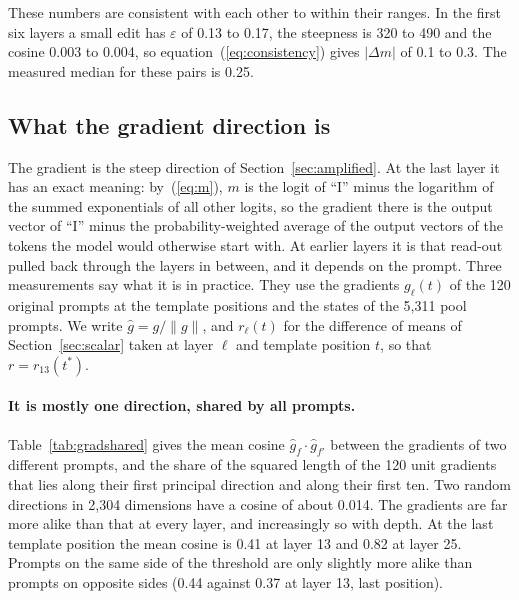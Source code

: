 \documentclass[11pt]{article}
\newcommand{\Dm}{\Delta m}
\begin{document}
These numbers are consistent with each other to within their ranges. In the first six layers a small edit has $\varepsilon$ of 0.13 to 0.17, the steepness is 320 to 490 and the cosine 0.003 to 0.004, so equation~(\ref{eq:consistency}) gives $|\Dm|$ of 0.1 to 0.3. The measured median for these pairs is 0.25.

\subsection{What the gradient direction is}
\label{sec:gradmeaning}

The gradient is the steep direction of Section~\ref{sec:amplified}. At the last layer it has an exact meaning: by~(\ref{eq:m}), $m$ is the logit of ``I'' minus the logarithm of the summed exponentials of all other logits, so the gradient there is the output vector of ``I'' minus the probability-weighted average of the output vectors of the tokens the model would otherwise start with. At earlier layers it is that read-out pulled back through the layers in between, and it depends on the prompt. Three measurements say what it is in practice. They use the gradients $g_\ell(t)$ of the 120 original prompts at the template positions and the states of the 5{,}311 pool prompts. We write $\hat g=g/\lVert g\rVert$, and $r_\ell(t)$ for the difference of means of Section~\ref{sec:scalar} taken at layer $\ell$ and template position $t$, so that $r=r_{13}(t^*)$.

\paragraph{It is mostly one direction, shared by all prompts.} Table~\ref{tab:gradshared} gives the mean cosine $\hat g_f\cdot\hat g_{f'}$ between the gradients of two different prompts, and the share of the squared length of the 120 unit gradients that lies along their first principal direction and along their first ten. Two random directions in 2{,}304 dimensions have a cosine of about 0.014. The gradients are far more alike than that at every layer, and increasingly so with depth. At the last template position the mean cosine is 0.41 at layer 13 and 0.82 at layer 25. Prompts on the same side of the threshold are only slightly more alike than prompts on opposite sides (0.44 against 0.37 at layer 13, last position).
\end{document}
